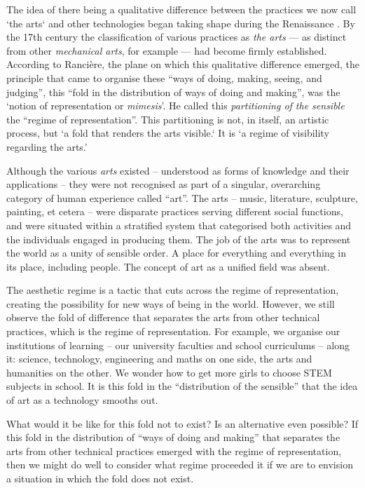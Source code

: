 \documentclass[letter:wpaper]{article}
\begin{document}
    The idea of there being a qualitative difference between the practices we now call ‘the arts‘ and other technologies began taking shape during the Renaissance \citep[p.136]{TatarkiewiczWhtIsArt1971}. By the 17th century the classification of various practices as \emph{the arts} — as distinct from other \emph{mechanical arts}, for example — had become firmly established. According to Rancière, the plane on which this qualitative difference emerged, the principle that came to organise these “ways of doing, making, seeing, and judging”, this “fold in the distribution of ways of doing and making”, was the ‘notion of representation or \emph{mimesis}’. He called this \emph{partitioning of the sensible} the “regime of representation”. This partitioning is not, in itself, an artistic process, but ‘a fold that renders the arts visible.‘ It is  ‘a regime of visibility regarding the arts.’ \citep[p.22]{RancierPltcsOfThAsthtcs2004}
    
    Although the various \emph{arts} existed – understood as forms of knowledge and their applications – they were not recognised as part of a singular, overarching category of human experience called “art”. The arts – music, literature, sculpture, painting, et cetera – were disparate practices serving different social functions, and were situated within a stratified system that categorised both activities and the individuals engaged in producing them. The job of the arts was to represent the world as a unity of sensible order. A place for everything and everything in its place, including people. The concept of art as a unified field was absent.
    
    The aesthetic regime is a tactic that cuts across the regime of representation, creating the possibility for new ways of being in the world. However, we still observe the fold of difference that separates the arts from other technical practices, which is the regime of representation. For example, we organise our institutions of learning – our university faculties and school curriculums – along it: science, technology, engineering and maths on one side, the arts and humanities on the other. We wonder how to get more girls to choose STEM subjects in school. It is this fold in the “distribution of the sensible” \citep[p.42]{RancierPltcsOfThAsthtcs2004} that the idea of art as a technology smooths out.
    
    What would it be like for this fold not to exist? Is an alternative even possible? If this fold in the distribution of “ways of doing and making” \citep[p.13]{RancierPltcsOfThAsthtcs2004} that separates the arts from other technical practices emerged with the regime of representation, then we might do well to consider what regime proceeded it if we are to envision a situation in which the fold does not exist.
    
\end{document}
